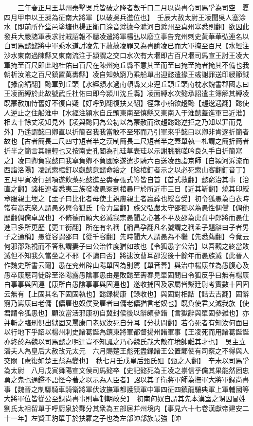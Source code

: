 　　三年春正月王基州泰擊吳兵皆破之降者數千口二月以尚書令司馬孚為司空　夏四月甲申以王昶為征南大將軍【以破吳兵進位也】　壬辰大赦太尉王凌聞吳人塞涂水【即前所作堂邑塗塘也楊正衡曰涂音滁據今滁河自滁州至真州塞悉則翻】欲因此發兵大嚴諸軍表求討賊詔報不聽凌遣將軍楊弘以廢立事告兖州刺史黃華華弘連名以白司馬懿懿將中軍乘水道討凌先下赦赦凌罪又為書諭凌已而大軍掩至百尺【水經注沙水東南過陳縣又東南流注于潁謂之交口水次有大堰即古百尺堰司馬宣王討王凌大軍掩至百尺即此地杜佑曰百尺在陳州宛丘縣不意其至而至曰掩至掩者掩其不備也我朝析汝隂之百尺鎮置萬夀縣】凌自知埶窮乃乘船單出迎懿遣掾王彧謝罪送印綬節鉞【掾俞絹翻】懿軍到丘頭【水經潁水過南頓縣又東逕丘頭丘頭南枕水魏書郡國志曰王凌面縛於此故號武丘杜佑曰即今潁川沈丘縣】凌面縛水次懿承詔遣主簿解其縛凌既蒙赦加恃舊好不復自疑【好呼到翻復扶又翻】徑乘小船欲趨懿【趨逡遇翻】懿使人逆止之住船淮中【水經注潁水自丘頭東南至慎縣又東南入于淮懿蓋進軍已近淮】相去十餘丈凌知見外【凌與懿同為公初以為蒙赦而欲趨懿懿逆拒之乃知以罪而見外】乃遥謂懿曰卿直以折簡召我我當敢不至邪而乃引軍來乎懿曰以卿非肯逐折簡者故也【古者簡長二尺四寸短者半之漢制簡長二尺短者半之蓋單執一札謂之簡折簡者折半之簡言其禮輕也又按南史孔闓為孔珪草表珪以示謝朓朓嗟吟良久手自折簡寫之】凌曰卿負我懿曰我寧負卿不負國家遂遣步騎六百送凌西詣京師【自潁河泝流而西詣洛陽】凌試索棺釘以觀懿意懿命給之【給棺釘者示之以必死索山客翻釘音丁】五月甲寅凌行到項遂飲藥死懿進至夀春張式等皆自首【首式救翻】懿窮治其事【治直之翻】諸相連者悉夷三族發凌愚冢剖棺暴尸於所近市三日【近其靳翻】燒其印綬章服親土埋之【孟子曰比化者毋使土親膚親土者臝葬也綬音受】初令狐愚為白衣時常有高志衆人謂愚必興令狐氏【令力呈翻】族父弘農太守邵獨以為愚性倜儻【倜他歷翻倜儻卓異也】不脩德而願大必滅我宗愚聞之心甚不平及邵為虎賁中郎將而愚仕進已多所更歷【更工衡翻】所在有名稱【稱昌孕翻凡名號謂之稱孟子題辭曰子者男子之通稱】愚從容謂邵曰【從千容翻】先時聞大人謂愚為不繼【先悉薦翻】今竟云何邪邵熟視而不答私謂妻子曰公治性度猶如故也【令狐愚字公治】以吾觀之終當敗滅但不知我久當坐之不邪【不讀曰否】將逮汝曹耳邵沒後十餘年而愚族滅【此晉人作魏史所書云爾】愚在兖州辟山陽單固為别駕【單音善】與治中楊康並為愚腹心及愚卒康應司徒辟至洛陽露愚隂事愚由是敗懿至夀春見單固問曰令狐反乎曰無有楊康白事事與固連【康所白愚隂事事與固連也】遂收捕固及家屬皆繫廷尉考實數十固固云無有【上固其名下固固執也】懿録楊康【録收也】與固對相詰【詰去吉翻】固辭窮乃罵康曰老傭【傭雇也奴僕受雇者曰傭老傭猶言老奴也】既負使君乂滅我族【使君謂令狐愚也】顧汝當活邪康初自冀封侯後以辭頗參錯【言獄辭與單固參雜也】亦并斬之臨刑俱出獄固又罵康曰老奴汝死自分耳【分扶問翻】若令死者有知汝何面目以行地下乎詔以楊州刺史諸葛誕為鎮東將軍都督揚州諸軍事【王凌死而用諸葛誕誕亦終於為魏以司馬懿之明達豈不知誕之乃心魏氏哉大敵在境帥難其才也】　吳主立潘夫人為皇后大赦改元太元　六月賜楚王彪死盡録諸王公置鄴使有司察之不得與人交關【慮復如楚王彪為變也】　秋七月壬戌皇后甄氏殂【甄之人翻】　辛未以司馬孚為太尉　八月戊寅舞陽宣文侯司馬懿卒【史記懿死為王凌之祟信乎儻其果能然固忠勇之鬼也通鑑不語怪今著之以示為人臣者】詔以其子衛將軍師為撫軍大將軍録尚書事【魏晉之制驃騎車騎衛將軍伏波撫軍都護鎮軍中軍四征四鎮龍驤典軍上軍輔國等大將軍位皆從公至録尚書事則專制朝政矣】　初南匈奴自謂其先本漢室之甥因冒姓劉氏太祖留單于呼厨泉於鄴分其衆為五部居并州境内【事見六十七卷漢獻帝建安二十一年】左賢王豹單于於扶羅之子也為左部帥部族最強【帥